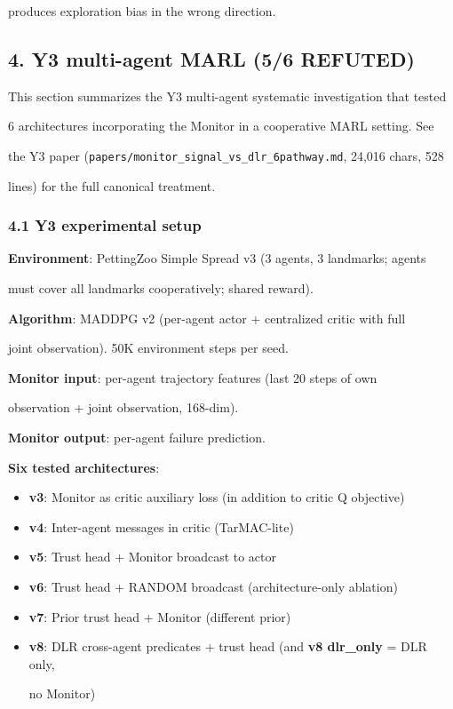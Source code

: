 \documentclass[
]{article}
\begin{document}
produces exploration bias in the wrong direction.

\subsection{4. Y3 multi-agent MARL (5/6
REFUTED)}\label{y3-multi-agent-marl-56-refuted}

This section summarizes the Y3 multi-agent systematic investigation that
tested

6 architectures incorporating the Monitor in a cooperative MARL setting.
See

the Y3 paper (\texttt{papers/monitor\_signal\_vs\_dlr\_6pathway.md},
24,016 chars, 528

lines) for the full canonical treatment.

\subsubsection{4.1 Y3 experimental setup}\label{y3-experimental-setup}

\textbf{Environment}: PettingZoo Simple Spread v3 (3 agents, 3
landmarks; agents

must cover all landmarks cooperatively; shared reward).

\textbf{Algorithm}: MADDPG v2 (per-agent actor + centralized critic with
full

joint observation). 50K environment steps per seed.

\textbf{Monitor input}: per-agent trajectory features (last 20 steps of
own

observation + joint observation, 168-dim).

\textbf{Monitor output}: per-agent failure prediction.

\textbf{Six tested architectures}:

\begin{itemize}
\item
  \textbf{v3}: Monitor as critic auxiliary loss (in addition to critic Q
  objective)
\item
  \textbf{v4}: Inter-agent messages in critic (TarMAC-lite)
\item
  \textbf{v5}: Trust head + Monitor broadcast to actor
\item
  \textbf{v6}: Trust head + RANDOM broadcast (architecture-only
  ablation)
\item
  \textbf{v7}: Prior trust head + Monitor (different prior)
\item
  \textbf{v8}: DLR cross-agent predicates + trust head (and \textbf{v8
  dlr\_only} = DLR only,

  no Monitor)
\end{itemize}
\end{document}
